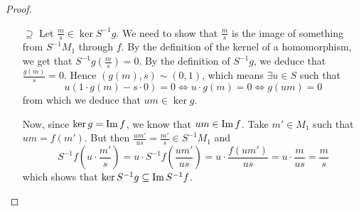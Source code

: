 \begin{exercise}
\begin{enumerate}
\begin{proof}
\begin{itemize}
        \item[\(\supseteq\)] Let \(\frac{m}{s} \in \ker S^{-1} g\). We need to show that \(\frac{m}{s}\) is the image of something from \(S^{-1} M_1\) through \(f\). By the definition of the kernel of a homomorphism, we get that \(S^{-1} g\left(\frac{m}{s}\right) = 0\). By the definition of \(S^{-1} g\), we deduce that \(\frac{g(m)}{s} = 0\). Hence \((g(m), s) \sim (0,1)\), which means \(\exists u \in S\) such that
        \[
            u(1 \cdot g(m) - s \cdot 0) = 0 \iff
            u \cdot g(m) = 0 \iff
            g(um) = 0
        \]
        from which we deduce that \(um \in \ker g\).
        
        Now, since \(\ker g = \operatorname{Im} f\), we know that \(um \in \operatorname{Im} f\). Take \(m' \in M_1\) such that \(um = f(m')\). But then \(\frac{um'}{us} = \frac{m'}{s} \in S^{-1} M_1\) and
        \[
            S^{-1} f \left(u \cdot \frac{m'}{s}\right) = u \cdot S^{-1} f \left(\frac{um'}{us}\right) = u \cdot \frac{f(um')}{us} = u \cdot \frac{m}{us} = \frac{m}{s}
        \]
        which shows that \(\ker S^{-1} g \subseteq \operatorname{Im} S^{-1} f\).
    \end{itemize}
    \end{proof}
    
    \begin{comment}
    \item If \(I, J \leq R\) and \(J\) is finitely generated, then \(S^{-1} (I : J) = S^{-1} I : S^{-1} J\). Give a counterexample to show that \(J\) finitely generated is essential.
    
    \begin{proof}
    We will prove this using double inclusion.
    \begin{itemize}
        \item[\(\subseteq\)] Let \(\frac{a}{s} \in S^{-1} (I : J)\). Then \(a \in I : J\).
        
        Take an arbitrary \(\frac{b}{t} \in S^{-1} J\). We have
        \[
            \frac{a}{1} \cdot \frac{b}{t} = \frac{\overbrace{a \cdot b}^{\in \, I}}{t} \in S^{-1} I
        \]
        hence \(\frac{a}{1} \in S^{-1} I : S^{-1} J\). But since the colon ideal of two ideals is also an ideal, we can multiply \(\frac{a}{1}\) by \(\frac{1}{s}\) to obtain
        \[
            \frac{1}{s} \cdot \frac{a}{1} = \frac{a}{s} \in S^{-1} I : S^{-1} J
        \]
        as desired.
        
        \item[\(\supseteq\)] Let \(\frac{a}{s} \in S^{-1} I : S^{-1} J\). To show that \(\frac{a}{s} \in S^{-1} (I : J)\), it's enough to check that \(a \in I : J\).
        

\end{comment}
\end{enumerate}
\end{exercise}
